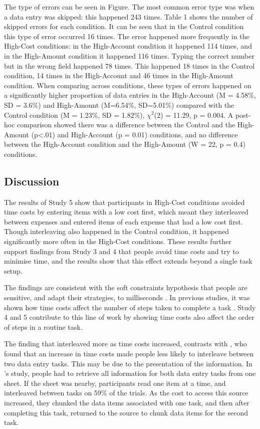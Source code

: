The type of errors can be seen in Figure. The most common error type was when a data entry was skipped: this happened 243 times. Table 1 shows the number of skipped errors for each condition. It can be seen that in the Control condition this type of error occurred 16 times. The error happened more frequently in the High-Cost conditions: in the High-Account condition it happened 114 times, and in the High-Amount condition it happened 116 times.
Typing the correct number but in the wrong field happened 78 times. This happened 18 times in the Control condition, 14 times in the High-Account and 46 times in the High-Amount condition.
When comparing across conditions, these types of errors happened on a significantly higher proportion of data entries in the High-Account (M = 4.58\%, SD = 3.6\%) and High-Amount (M=6.54\%, SD=5.01\%) compared with the Control condition (M = 1.23\%, SD = 1.82\%),  $\chi^2$(2) = 11.29, p = 0.004.  A post-hoc comparison showed there was a difference between the Control and the High-Amount (p<.01) and High-Account (p = 0.01) conditions, and no difference between the High-Account condition and the High-Amount (W = 22, p = 0.4) conditions.

\subsection{Discussion}
The results of Study 5 show that participants in High-Cost conditions avoided time costs by entering items with a low cost first, which meant they interleaved between expenses and entered items of each expense that had a low cost first. Though interleaving also happened in the Control condition, it happened significantly more often in the High-Cost conditions. These results further support findings from Study 3 and 4 that people avoid time costs and try to minimise time, and the results show that this effect extends beyond a single task setup.

The findings are consistent with the soft constraints hypothesis that people are sensitive, and adapt their strategies, to milliseconds \citep{Charman 2003, Gray2000}. In previous studies, it was shown how time costs affect the number of steps taken to complete a task \citep{Gray2006}. Study 4 and 5 contribute to this line of work by showing time costs also affect the order of steps in a routine task.

The finding that interleaved more as time costs increased, contrasts with \citet{Back2012}, who found that an increase in time costs made people less likely to interleave between two data entry tasks. This may be due to the presentation of the information. In \citet{Back2012}'s study, people had to retrieve all information for both data entry tasks from one sheet. If the sheet was nearby, participants read one item at a time, and interleaved between tasks on 59\% of the trials.  As the cost to access this source increased, they chunked the data items associated with one task, and then after completing this task, returned to the source to chunk data items for the second task. 

